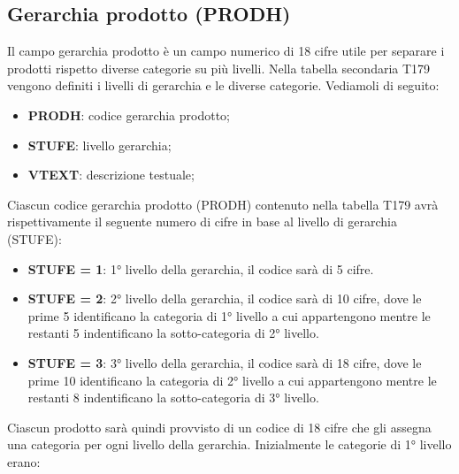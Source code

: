 \subsection{Gerarchia prodotto (PRODH)}
Il campo gerarchia prodotto è un campo numerico di 18 cifre utile per separare i prodotti rispetto diverse categorie su più livelli.
Nella tabella secondaria T179 vengono definiti i livelli di gerarchia e le diverse categorie. 
Vediamoli di seguito:
\begin{itemize}
	\item \textbf{PRODH}: codice gerarchia prodotto;
	\item \textbf{STUFE}: livello gerarchia;
	\item \textbf{VTEXT}: descrizione testuale;
\end{itemize} 

Ciascun codice gerarchia prodotto (PRODH) contenuto nella tabella T179 avrà rispettivamente il seguente numero di cifre in base al livello di gerarchia (STUFE):
\begin{itemize}
	\item \textbf{STUFE = 1}: 1° livello della gerarchia, il codice sarà di 5 cifre.
	\item \textbf{STUFE = 2}: 2° livello della gerarchia, il codice sarà di 10 cifre, dove le prime 5 identificano la categoria di 1° livello a cui appartengono mentre le restanti 5 indentificano la sotto-categoria di 2° livello.
	\item \textbf{STUFE = 3}: 3° livello della gerarchia, il codice sarà di 18 cifre, dove le prime 10 identificano la categoria di 2° livello a cui appartengono mentre le restanti 8 indentificano la sotto-categoria di 3° livello.
\end{itemize}

Ciascun prodotto sarà quindi provvisto di un codice di 18 cifre che gli assegna una categoria per ogni livello della gerarchia.
Inizialmente le categorie di 1° livello erano:\\


